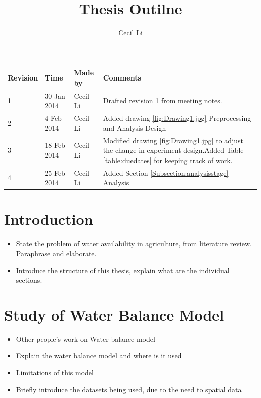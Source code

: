 \documentclass[12pt,journal,compsoc,onecolumn]{IEEEtran}
\begin{document}
\title{Thesis Outilne}
\author{Cecil Li}

\maketitle
\begin{center}
    \begin{tabular}{ | l | l | l | p{8cm} |}
    \hline
    Revision & Time & Made by & Comments \\ \hline
    1 & 30 Jan 2014 & Cecil Li & Drafted revision 1 from meeting notes.\\ \hline
    2 & 4 Feb 2014 & Cecil Li & Added drawing \ref{fig:Drawing1.jpg} Preprocessing and Analysis Design\\ \hline
    3 & 18 Feb 2014 & Cecil Li & Modified drawing \ref{fig:Drawing1.jpg} to adjust the change in experiment design.\newline    Added Table \ref{table:duedates} for keeping track of work.\\ \hline
    4 & 25 Feb 2014 & Cecil Li & Added Section \ref{Subsection:analysisstage} Analysis \\ \hline
    \end{tabular}
\end{center}
\newpage
\section{Introduction}
\begin{itemize}
\item
State the problem of water availability in agriculture, from literature review. Paraphrase and elaborate.
\item
Introduce the structure of this thesis, explain what are the individual sections.
\end{itemize}

\section{Study of Water Balance Model}
\begin{itemize}
\item
Other people's work on Water balance model
\item
Explain the water balance model and where is it used
\item
Limitations of this model
\item
Briefly introduce the datasets being used, due to the need to spatial data
\end{itemize}
\end{document}
